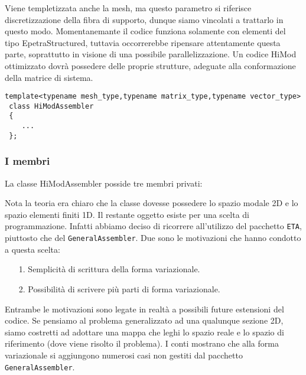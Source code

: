  
 Viene templetizzata anche la mesh, ma questo parametro si riferisce discretizzazione della fibra di supporto, dunque siamo vincolati a trattarlo in questo modo.
 Momentanemante il codice funziona solamente con elementi del tipo EpetraStructured, tuttavia occorrerebbe ripensare attentamente questa parte, soprattutto in visione di una possibile parallelizzazione.
Un codice HiMod ottimizzato dovr\`a possedere delle proprie strutture, adeguate alla conformazione della matrice di sistema.

 \begin{lstlisting}[style = general]
 template<typename mesh_type,typename matrix_type,typename vector_type>
 class HiModAssembler
 {
	... 
 };
 \end{lstlisting}
 
\subsubsection{I membri}
La classe HiModAssembler posside tre membri privati:


Nota la teoria era chiaro che la classe dovesse possedere lo spazio modale 2D e lo spazio elementi finiti 1D.
Il restante oggetto esiste per una scelta di programmazione. Infatti abbiamo deciso di ricorrere all'utilizzo del pacchetto \texttt{ETA}, piuttosto che del \texttt{GeneralAssembler}. Due sono le motivazioni che hanno condotto a questa scelta:
\begin{itemize}
\item[1.] Semplicit\`a di scrittura della forma variazionale.
\item[2.] Possibilit\`a di scrivere pi\`u parti di forma variazionale.
\end{itemize}

Entrambe le motivazioni sono legate in realt\`a a possibili future estensioni del codice. Se pensiamo al problema generalizzato ad una qualunque sezione 2D, siamo costretti ad adottare una mappa che leghi lo spazio reale e lo spazio di riferimento (dove viene risolto il problema). I conti mostrano che alla forma variazionale si aggiungono numerosi casi non gestiti dal pacchetto \texttt{GeneralAssembler}.

